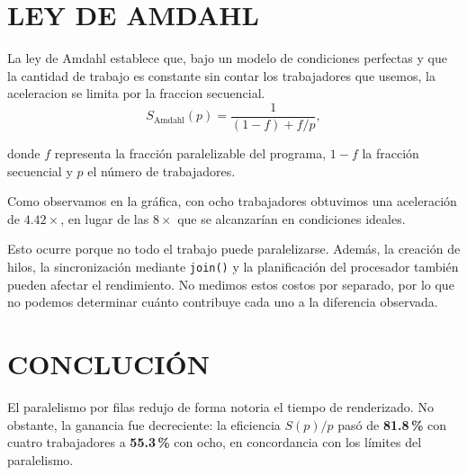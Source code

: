 \documentclass[conference,letterpaper,10pt]{IEEEtran}
\begin{document}
\section{LEY DE AMDAHL}
La ley de Amdahl establece que, bajo un modelo de condiciones perfectas y que la cantidad de trabajo es constante
sin contar los trabajadores que usemos, la aceleracion se limita por la fraccion secuencial.
\begin{equation}
S_{\mathrm{Amdahl}}(p)=\frac{1}{(1-f)+f/p},
\label{eq:amdahl}
\end{equation}

donde $f$ representa la fracción paralelizable del programa, $1-f$ la fracción secuencial y $p$ el número de trabajadores.

Como observamos en la gráfica, con ocho trabajadores obtuvimos una aceleración de $4.42\times$, en lugar de las $8\times$ que
se alcanzarían en condiciones ideales.

Esto ocurre porque no todo el trabajo puede paralelizarse. Además, la creación de hilos, la sincronización mediante
\texttt{join()} y la planificación del procesador también pueden afectar el rendimiento. No medimos estos costos por
separado, por lo que no podemos determinar cuánto contribuye cada uno a la diferencia observada.


\section{CONCLUCIÓN}

El paralelismo por filas redujo de forma notoria el tiempo de renderizado. No obstante, la ganancia fue
decreciente: la eficiencia $S(p)/p$ pasó de \textbf{81.8\,\%}  con cuatro
trabajadores a \textbf{55.3\,\%} con ocho, en concordancia con los
límites del paralelismo.

\addtolength{\textheight}{-12cm} 
\end{document}
